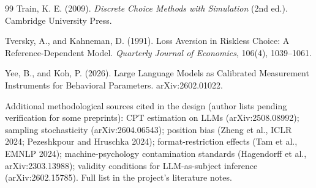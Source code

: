 \documentclass[11pt]{article}
\begin{document}
\begin{thebibliography}{99}
Train, K. E. (2009).
\textit{Discrete Choice Methods with Simulation} (2nd ed.). Cambridge University Press.

Tversky, A., and Kahneman, D. (1991).
Loss Aversion in Riskless Choice: A Reference-Dependent Model.
\textit{Quarterly Journal of Economics}, 106(4), 1039--1061.

Yee, B., and Koh, P. (2026).
Large Language Models as Calibrated Measurement Instruments for Behavioral Parameters. arXiv:2602.01022.

\end{thebibliography}

\vspace{0.5em}
{\footnotesize \noindent Additional methodological sources cited in the design (author lists pending
verification for some preprints): CPT estimation on LLMs (arXiv:2508.08992); sampling stochasticity
(arXiv:2604.06543); position bias (Zheng et al., ICLR 2024; Pezeshkpour and Hruschka 2024);
format-restriction effects (Tam et al., EMNLP 2024); machine-psychology contamination standards
(Hagendorff et al., arXiv:2303.13988); validity conditions for LLM-as-subject inference
(arXiv:2602.15785). Full list in the project's literature notes.}
\end{document}
